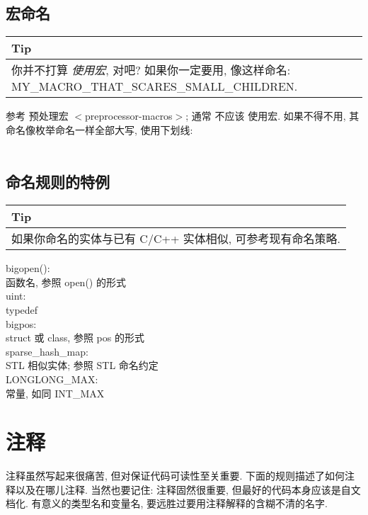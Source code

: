 \documentclass[a4paper,11pt,CJK]{article}
\begin{document}
\begin{CJK}{UTF8}{gbsn}
\subsection{宏命名}
\begin{table}[htbp]
\flushleft
\begin{tabular}{p{400pt}}
\toprule
\rowcolor[gray]{.8} Tip \\
\midrule
你并不打算 \emph{使用宏}, 对吧? 如果你一定要用, 像这样命名: MY\_MACRO\_THAT\_SCARES\_SMALL\_CHILDREN.
\\
\bottomrule
\end{tabular}
\end{table}
\noindent
参考 预处理宏 $<$preprocessor-macros$>$; 通常 不应该 使用宏. 如果不得不用, 其命名像枚举命名一样全部大写, 使用下划线:\\
\\

\subsection{命名规则的特例}
\begin{table}[htbp]
\flushleft
\begin{tabular}{p{400pt}}
\toprule
\rowcolor[gray]{.8} Tip \\
\midrule
如果你命名的实体与已有 C/C++ 实体相似, 可参考现有命名策略.
\\
\bottomrule
\end{tabular}
\end{table}
\noindent
bigopen():\\
\indent 函数名, 参照 open() 的形式\\
uint:\\
\indent typedef\\
bigpos:\\
\indent struct 或 class, 参照 pos 的形式\\
sparse\_hash\_map:\\
\indent STL 相似实体; 参照 STL 命名约定\\
LONGLONG\_MAX:\\
\indent 常量, 如同 INT\_MAX


\newpage

\section{注释}
注释虽然写起来很痛苦, 但对保证代码可读性至关重要. 下面的规则描述了如何注释以及在哪儿注释. 当然也要记住: 注释固然很重要, 但最好的代码本身应该是自文档化. 有意义的类型名和变量名, 要远胜过要用注释解释的含糊不清的名字.



\end{CJK}
\end{document}
